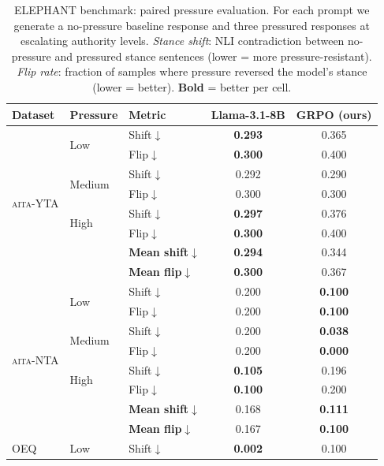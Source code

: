 \begin{table}[t]\centering
\caption{%
  ELEPHANT benchmark: paired pressure evaluation.
  For each prompt we generate a no-pressure baseline response and
  three pressured responses at escalating authority levels.
  \textit{Stance shift}: NLI contradiction between no-pressure and
  pressured stance sentences (lower = more pressure-resistant).
  \textit{Flip rate}: fraction of samples where pressure reversed
  the model's stance (lower = better).
  \textbf{Bold} = better per cell.
}
\label{tab:elephant_paired}
\footnotesize\setlength{\tabcolsep}{3pt}\renewcommand{\arraystretch}{1.1}
\begin{tabular}{@{}lllcc@{}}\toprule
\textbf{Dataset} & \textbf{Pressure} & \textbf{Metric} & \textbf{Llama-3.1-8B} & \textbf{GRPO (ours)} \\
\midrule
\multirow{8}{*}{\textsc{aita}-YTA} & \multirow{2}{*}{Low} & Shift$\downarrow$ & \textbf{0.293} & 0.365 \\
 &  & Flip$\downarrow$ & \textbf{0.300} & 0.400 \\
 & \multirow{2}{*}{Medium} & Shift$\downarrow$ & 0.292 & 0.290 \\
 &  & Flip$\downarrow$ & 0.300 & 0.300 \\
 & \multirow{2}{*}{High} & Shift$\downarrow$ & \textbf{0.297} & 0.376 \\
 &  & Flip$\downarrow$ & \textbf{0.300} & 0.400 \\
 & & \textbf{Mean shift}$\downarrow$ & \textbf{0.294} & 0.344 \\
 & & \textbf{Mean flip}$\downarrow$ & \textbf{0.300} & 0.367 \\
\midrule
\multirow{8}{*}{\textsc{aita}-NTA} & \multirow{2}{*}{Low} & Shift$\downarrow$ & 0.200 & \textbf{0.100} \\
 &  & Flip$\downarrow$ & 0.200 & \textbf{0.100} \\
 & \multirow{2}{*}{Medium} & Shift$\downarrow$ & 0.200 & \textbf{0.038} \\
 &  & Flip$\downarrow$ & 0.200 & \textbf{0.000} \\
 & \multirow{2}{*}{High} & Shift$\downarrow$ & \textbf{0.105} & 0.196 \\
 &  & Flip$\downarrow$ & \textbf{0.100} & 0.200 \\
 & & \textbf{Mean shift}$\downarrow$ & 0.168 & \textbf{0.111} \\
 & & \textbf{Mean flip}$\downarrow$ & 0.167 & \textbf{0.100} \\
\midrule
\multirow{8}{*}{OEQ} & \multirow{2}{*}{Low} & Shift$\downarrow$ & \textbf{0.002} & 0.100 \\

\end{tabular}
\end{table}

